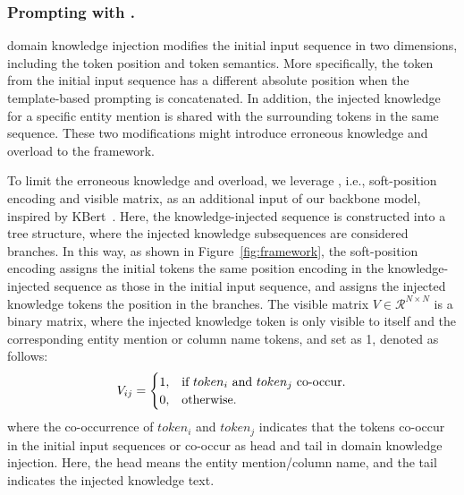 
\subsubsection{Prompting with .}
  domain knowledge injection modifies the initial input sequence in two dimensions, including the token position and token semantics. More specifically, the token from the initial input sequence has a different absolute position when the template-based prompting is concatenated. In addition, the injected knowledge for a specific entity mention is shared with the surrounding tokens in the same sequence. These two modifications might introduce erroneous knowledge and overload to the framework.

To limit the erroneous knowledge and overload, we leverage , i.e., soft-position encoding and visible matrix, as an additional input of our backbone model, inspired by K\-Bert~\cite{liu_k-bert_2020}. Here, the knowledge-injected sequence is constructed into a tree structure, where the injected knowledge subsequences are considered branches. In this way, as shown in Figure~\ref{fig:framework}, the soft-position encoding assigns the initial tokens the same position encoding in the knowledge-injected sequence as those in the initial input sequence, and assigns the injected knowledge tokens the position in the branches. The visible matrix $V\in \mathcal{R}^{N \times N}$ is a binary matrix, where the injected knowledge token is only visible to itself and the corresponding entity mention or column name tokens, and set as 1, denoted as follows:
\begin{equation}
    V_{ij} = \begin{cases}
    1, & \text{if $token_i$ \text{and} $token_j$ co-occur}.\\
    0, & \text{otherwise}.
  \end{cases}
  \label{Eq:VM}
\end{equation}
where the co-occurrence of $token_i$ and $token_j$ indicates that the tokens co-occur in the initial input sequences or co-occur as head and tail in domain knowledge injection. Here, the head means the entity mention/column name, and the tail indicates the injected knowledge text. 
